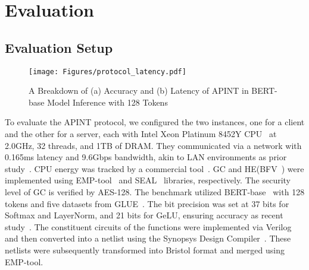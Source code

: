 \section{Evaluation}


\subsection{Evaluation Setup}

\begin{figure}[t]
\vspace{-0.12in}
\centering
\texttt{[image: Figures/protocol\_latency.pdf]}
\caption{A Breakdown of (a) Accuracy and (b) Latency of APINT in BERT-base Model Inference
with 128 Tokens}
\vspace{-0.2in}
\label{fig:protocol_latency}
\end{figure}

To evaluate the APINT protocol, we configured the two instances, one for a client and the other for a server, each with Intel Xeon Platinum 8452Y CPU~\cite{intelIntelXeon} at 2.0GHz, 32 threads, and 1TB of DRAM. They communicated via a network with 0.165ms latency and 9.6Gbps bandwidth, akin to LAN environments as prior study~\cite{boemer2020mp2ml}. CPU energy was tracked by a commercial tool~\cite{intelRunningAverage}. GC and HE(BFV~\cite{brakerski2014leveled}) were implemented using EMP-tool~\cite{emp-toolkit} and SEAL~\cite{sealcrypto} libraries, respectively. The security level of GC is verified by AES-128. The benchmark utilized BERT-base~\cite{devlin2018bert} with 128 tokens and five datasets from GLUE~\cite{wang2018glue}. The bit precision was set at 37 bits for Softmax and LayerNorm, and 21 bits for GeLU, ensuring accuracy as recent study~\cite{pang2023bolt}.
The constituent circuits of the functions were implemented via Verilog and then converted into a netlist using the Synopsys Design Compiler~\cite{synopsysDesignCompiler}. These netlists were subsequently transformed into Bristol format and merged using EMP-tool.

